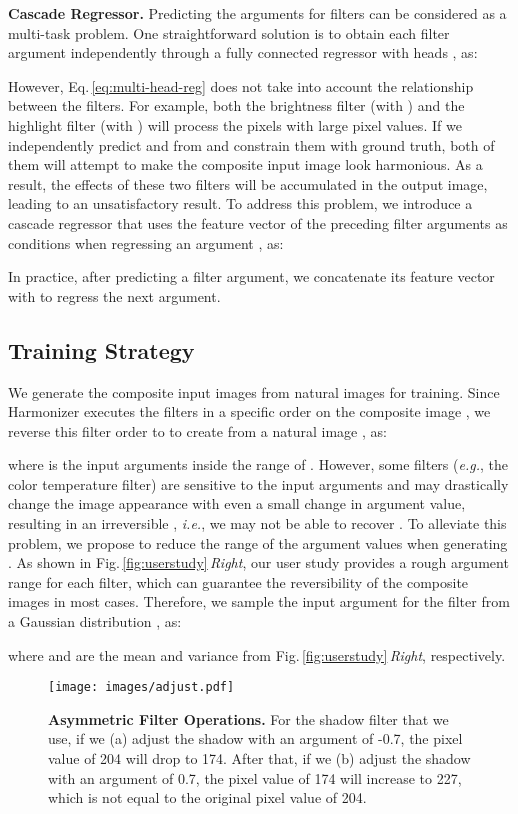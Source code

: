 \documentclass[runningheads]{llncs}
\newcommand{\ke}[1]{{\color{black}#1}}
\begin{document}
\textbf{Cascade Regressor.} 
Predicting the arguments for  filters can be considered as a multi-task problem. One straightforward solution is to obtain each filter argument  independently through a fully connected regressor  with  heads , as:

\ke{However, Eq.\,\ref{eq:multi-head-reg} does not take into account the relationship between the filters.}
For example, both the brightness filter (with ) and the highlight filter (with ) will process the pixels with large pixel values. If we independently predict  and  from  \ke{and constrain them with ground truth, both of them will attempt to make the composite input image look harmonious}. As a result, the effects of these two filters will be accumulated in the output image, leading to an unsatisfactory result.  
To address this problem, we introduce a cascade regressor that uses the feature vector of the preceding filter arguments as conditions when regressing an argument , as: 

In practice, after predicting a filter argument, we concatenate its feature vector with  to regress the next argument.




\subsection{Training Strategy}
We generate the composite input images from natural images for training.
Since Harmonizer executes the  filters in a specific order  on the composite image , we reverse this filter order to  to create  from a natural image , as:

where  is the input arguments inside the range of .
However, some filters ({\it e.g.}, the color temperature filter) are sensitive to the input arguments and may drastically change the image appearance with even a small change in argument value, resulting in an irreversible , {\it i.e.}, we may not be able to recover . 
To \ke{alleviate} this problem, we propose to reduce the range of the argument values
when generating . As shown in Fig.\,\ref{fig:userstudy}\,\textit{Right}, our user study provides a rough argument range for each filter, which can guarantee the reversibility of the composite images \ke{in most cases}. Therefore, we sample the input argument  for the filter  from a Gaussian distribution , as:

where  and  are the mean and variance from Fig.\,\ref{fig:userstudy}\,\textit{Right}, respectively. 


\begin{figure}[t]
\centering
\texttt{[image: images/adjust.pdf]}
{\begin{center}
\vspace{-0.5cm}
\caption{\textbf{Asymmetric Filter Operations.} For the shadow filter that we use, if we (a) adjust the shadow with an argument of -0.7, the pixel value of 204 will drop to 174. After that, if we (b) adjust the shadow with an argument of 0.7, the pixel value of 174 will increase to 227, which is not equal to the original pixel value of 204.}
\label{fig:shadow}
\end{center}
}
\vspace{-0.3cm}
\end{figure}
\end{document}
